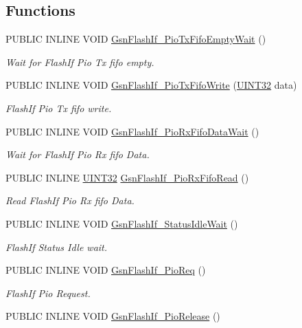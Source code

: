 \subsection*{Functions}
\begin{DoxyCompactItemize}
\item 
PUBLIC INLINE VOID \hyperlink{a00647_ga0e52d153a54a5e099ea53b4ab2ba02bc}{GsnFlashIf\_\-PioTxFifoEmptyWait} ()
\begin{DoxyCompactList}\small\item\em Wait for FlashIf Pio Tx fifo empty. \end{DoxyCompactList}\item 
PUBLIC INLINE VOID \hyperlink{a00647_ga31cfba744b7133b256ba57713dc14e0f}{GsnFlashIf\_\-PioTxFifoWrite} (\hyperlink{a00660_gae1e6edbbc26d6fbc71a90190d0266018}{UINT32} data)
\begin{DoxyCompactList}\small\item\em FlashIf Pio Tx fifo write. \end{DoxyCompactList}\item 
PUBLIC INLINE VOID \hyperlink{a00647_ga035c5d3ec64ab8e86cacf6cd39762303}{GsnFlashIf\_\-PioRxFifoDataWait} ()
\begin{DoxyCompactList}\small\item\em Wait for FlashIf Pio Rx fifo Data. \end{DoxyCompactList}\item 
PUBLIC INLINE \hyperlink{a00660_gae1e6edbbc26d6fbc71a90190d0266018}{UINT32} \hyperlink{a00647_ga3c41c43e8ea5c81f7c5307820685fdaf}{GsnFlashIf\_\-PioRxFifoRead} ()
\begin{DoxyCompactList}\small\item\em Read FlashIf Pio Rx fifo Data. \end{DoxyCompactList}\item 
PUBLIC INLINE VOID \hyperlink{a00647_ga2e7a4bf76eb4e6da69d976bd9337a863}{GsnFlashIf\_\-StatusIdleWait} ()
\begin{DoxyCompactList}\small\item\em FlashIf Status Idle wait. \end{DoxyCompactList}\item 
PUBLIC INLINE VOID \hyperlink{a00647_ga5acfd4e90824451ba8ac4ec7f2aef58e}{GsnFlashIf\_\-PioReq} ()
\begin{DoxyCompactList}\small\item\em FlashIf Pio Request. \end{DoxyCompactList}\item 
PUBLIC INLINE VOID \hyperlink{a00647_gafdff247602c68652a230d5335f34f519}{GsnFlashIf\_\-PioRelease} ()

\end{DoxyCompactItemize}
